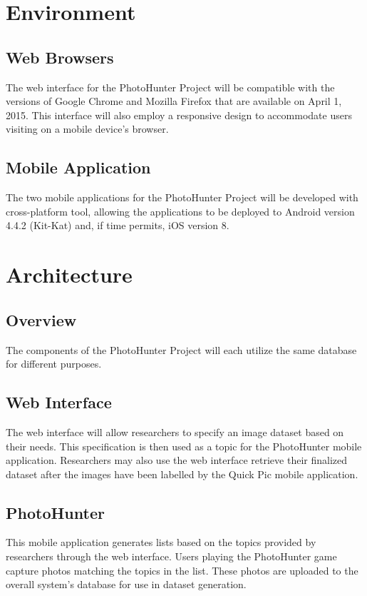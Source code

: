 \documentclass{article}
\begin{document}
\section{Environment}

\subsection{Web Browsers}
The web interface for the PhotoHunter Project will be compatible with the
versions of Google Chrome and Mozilla Firefox that are available on
April 1, 2015. This interface will also employ a
responsive design to accommodate users visiting on a mobile device's browser.

\subsection{Mobile Application}
The two mobile applications for the PhotoHunter Project will be developed with
cross-platform tool, allowing the applications to be deployed to Android
version 4.4.2 (Kit-Kat) and, if time permits, iOS version 8.

\section{Architecture}

\subsection{Overview}
The components of the PhotoHunter Project will each utilize the same database
for different purposes.

\subsection{Web Interface}
The web interface will allow researchers to specify an image dataset based on
their needs. This specification is then used as a topic for the PhotoHunter
mobile application. Researchers may also use the web interface retrieve their
finalized dataset after the images have been labelled by the Quick Pic mobile
application. 

\subsection{PhotoHunter}
This mobile application generates lists based on the topics provided by
researchers through the web interface. Users playing the PhotoHunter game
capture photos matching the topics in the list. These photos are uploaded to
the overall system's database for use in dataset generation.
\end{document}
